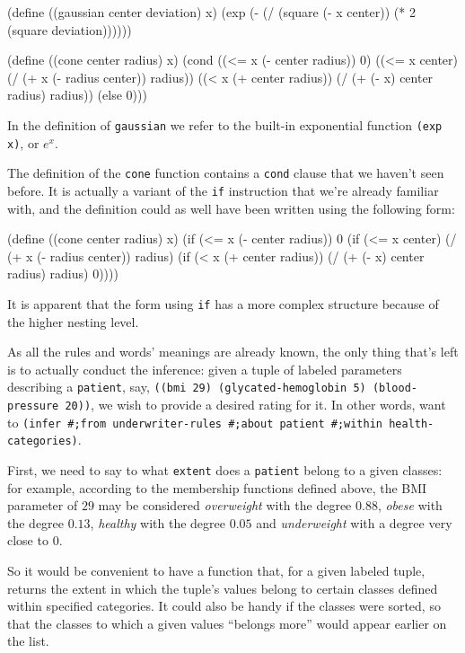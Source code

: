 \begin{Snippet}
(define ((gaussian center deviation) x)
  (exp (- (/ (square (- x center))
	     (* 2 (square deviation))))))
\end{Snippet}
\begin{Snippet}
(define ((cone center radius) x)
  (cond ((<= x (- center radius))
	 0)
	((<= x center)
	 (/ (+ x (- radius center)) radius))
	((< x (+ center radius))
	 (/ (+ (- x) center radius) radius))
	(else
	 0)))
\end{Snippet}

In the definition of \texttt{gaussian} we refer to the
built-in exponential function \texttt{(exp x)}, or $e^{x}$.

The definition of the \texttt{cone} function contains
a \texttt{cond} clause that we haven't seen before. It
is actually a variant of the \texttt{if} instruction
that we're already familiar with, and the definition
could as well have been written using the following form:

\begin{Snippet}
(define ((cone center radius) x)
  (if (<= x (- center radius))
    0
    (if (<= x center)
      (/ (+ x (- radius center)) radius)
      (if (< x (+ center radius))
        (/ (+ (- x) center radius) radius)
	0))))
\end{Snippet}

It is apparent that the form using \texttt{if}
has a more complex structure because of the
higher nesting level.

As all the rules and words' meanings are already known,
the only thing that's left is to actually conduct the
inference: given a tuple of labeled parameters describing
a \texttt{patient}, say, \texttt{((bmi 29) (glycated-hemoglobin 5)
(blood-pressure 20))}, we wish to provide a desired rating for it.
In other words, want to \texttt{(infer \#;from underwriter\--rules
\#;about patient \#;within health-categories)}.

First, we need to say to what \texttt{extent} does a
\texttt{patient} belong to a given classes: for example,
according to the membership functions defined above,
the BMI parameter of $29$ may be considered \textit{overweight}
with the degree $0.88$, \textit{obese} with the degree $0.13$,
\textit{healthy} with the degree $0.05$ and \textit{underweight}
with a degree very close to $0$.

So it would be convenient to have a function that, for
a given labeled tuple, returns the extent in which the
tuple's values belong to certain classes defined within
specified categories. It could also be handy if the classes
were sorted, so that the classes to which a given values
``belongs more'' would appear earlier on the list.

